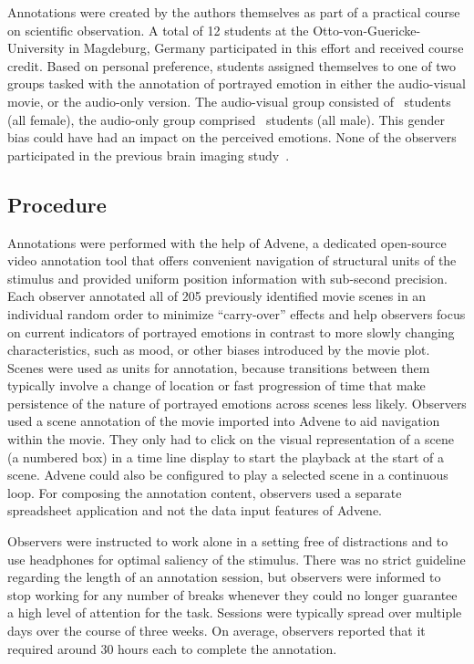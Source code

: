 \documentclass[10pt,a4paper,twocolumn]{article}
\begin{document}
Annotations were created by the authors themselves as part of a practical
course on scientific observation. A total of 12 students at the
Otto-von-Guericke-University in Magdeburg, Germany participated in this effort
and received course credit. Based on personal preference, students assigned
themselves to one of two groups tasked with the annotation of portrayed emotion
in either the audio-visual movie, or the audio-only version. The audio-visual
group consisted of \AVTotalRaters\ students (all female), the audio-only group
comprised \AOTotalRaters\ students (all male). This gender bias could have had
an impact on the perceived emotions. None of the observers participated in the
previous brain imaging study~\cite{HBI+14}.

\subsection*{Procedure}

Annotations were performed with the help of Advene\cite{AP2005}, a dedicated
open-source video annotation tool that offers convenient navigation of
structural units of the stimulus and provided uniform position information with
sub-second precision. Each observer annotated all of 205 previously identified
movie scenes in an individual random order to minimize ``carry-over'' effects
and help observers focus on current indicators of portrayed emotions in
contrast to more slowly changing characteristics, such as mood, or other biases
introduced by the movie plot. Scenes were used as units for annotation, because
transitions between them typically involve a change of location or fast
progression of time that make persistence of the nature of portrayed emotions
across scenes less likely. Observers used a scene annotation of the movie
imported into Advene to aid navigation within the movie. They only had to
click on the visual representation of a scene (a numbered box) in a time line
display to start the playback at the start of a scene. Advene could also be
configured to play a selected scene in a continuous loop. For composing the
annotation content, observers used a separate spreadsheet application and not
the data input features of Advene.

Observers were instructed to work alone in a setting free of distractions and
to use headphones for optimal saliency of the stimulus. There was no strict
guideline regarding the length of an annotation session, but observers were
informed to stop working for any number of breaks whenever they could no longer
guarantee a high level of attention for the task. Sessions were typically
spread over multiple days over the course of three weeks. On average, observers
reported that it required around 30 hours each to complete the annotation.
\end{document}
